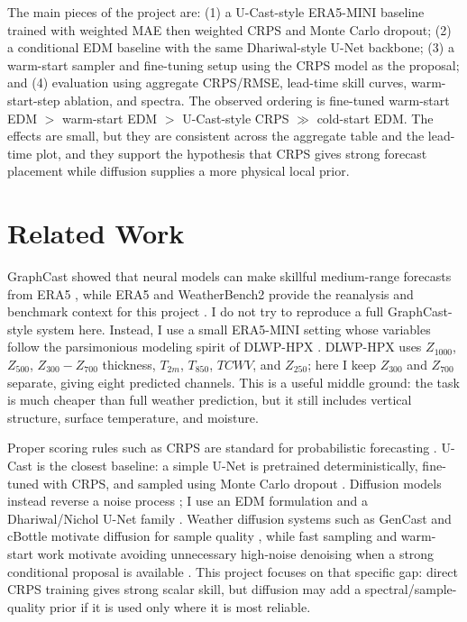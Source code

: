 \documentclass{article}
\begin{document}
The main pieces of the project are: (1) a U-Cast-style ERA5-MINI baseline trained with weighted MAE then weighted CRPS and Monte Carlo dropout; (2) a conditional EDM baseline with the same Dhariwal-style U-Net backbone; (3) a warm-start sampler and fine-tuning setup using the CRPS model as the proposal; and (4) evaluation using aggregate CRPS/RMSE, lead-time skill curves, warm-start-step ablation, and spectra. The observed ordering is fine-tuned warm-start EDM $>$ warm-start EDM $>$ U-Cast-style CRPS $\gg$ cold-start EDM. The effects are small, but they are consistent across the aggregate table and the lead-time plot, and they support the hypothesis that CRPS gives strong forecast placement while diffusion supplies a more physical local prior.

\section{Related Work}

GraphCast showed that neural models can make skillful medium-range forecasts from ERA5 \citep{lam2023graphcast}, while ERA5 and WeatherBench2 provide the reanalysis and benchmark context for this project \citep{hersbach2020era5,rasp2024weatherbench2}. I do not try to reproduce a full GraphCast-style system here. Instead, I use a small ERA5-MINI setting whose variables follow the parsimonious modeling spirit of DLWP-HPX \citep{karlbauer2024healpix}. DLWP-HPX uses $Z_{1000}$, $Z_{500}$, $Z_{300}-Z_{700}$ thickness, $T_{2m}$, $T_{850}$, $TCWV$, and $Z_{250}$; here I keep $Z_{300}$ and $Z_{700}$ separate, giving eight predicted channels. This is a useful middle ground: the task is much cheaper than full weather prediction, but it still includes vertical structure, surface temperature, and moisture.

Proper scoring rules such as CRPS are standard for probabilistic forecasting \citep{gneiting2007proper}. U-Cast is the closest baseline: a simple U-Net is pretrained deterministically, fine-tuned with CRPS, and sampled using Monte Carlo dropout \citep{cachay2026ucast,gal2016dropout}. Diffusion models instead reverse a noise process \citep{ho2020ddpm}; I use an EDM formulation \citep{karras2022edm} and a Dhariwal/Nichol U-Net family \citep{dhariwal2021diffusion,ronneberger2015unet}. Weather diffusion systems such as GenCast and cBottle motivate diffusion for sample quality \citep{price2025gencast,brenowitz2025cbottle}, while fast sampling and warm-start work motivate avoiding unnecessary high-noise denoising when a strong conditional proposal is available \citep{salimans2022progressive,scholz2025warmstarts}. This project focuses on that specific gap: direct CRPS training gives strong scalar skill, but diffusion may add a spectral/sample-quality prior if it is used only where it is most reliable.
\end{document}
